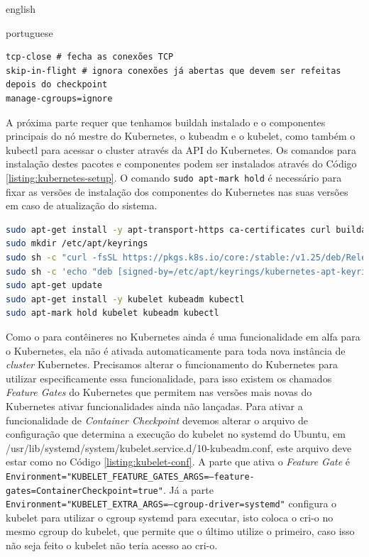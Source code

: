 \begin{otherlanguage*}{english}
\begin{otherlanguage*}{portuguese}
\begin{lstlisting}[language=plaintext,caption={Configuração a ser incluída no arquivo de configurações do runc para o CRIU.},label={listing:runc-conf}]
tcp-close # fecha as conexões TCP
skip-in-flight # ignora conexões já abertas que devem ser refeitas depois do checkpoint
manage-cgroups=ignore
\end{lstlisting}

A próxima parte requer que tenhamos buildah instalado e o componentes principais do nó
mestre do Kubernetes, o kubeadm e o kubelet, como também o kubectl para acessar o cluster
através da  API do Kubernetes. Os comandos para instalação destes pacotes e componentes podem
ser instalados através do Código \ref{listing:kubernetes-setup}. O comando \texttt{sudo apt-mark hold}
é necessário para fixar as versões de instalação dos componentes do Kubernetes nas suas
versões em caso de atualização do sistema.

\begin{lstlisting}[language=bash,caption={Instalação dos pacotes necessários para Kubernetes e buildah.},label={listing:kubernetes-setup}]
sudo apt-get install -y apt-transport-https ca-certificates curl buildah make
sudo mkdir /etc/apt/keyrings
sudo sh -c "curl -fsSL https://pkgs.k8s.io/core:/stable:/v1.25/deb/Release.key | gpg --dearmor -o /etc/apt/keyrings/kubernetes-apt-keyring.gpg"
sudo sh -c 'echo "deb [signed-by=/etc/apt/keyrings/kubernetes-apt-keyring.gpg] https://pkgs.k8s.io/core:/stable:/v1.25/deb/ /" | tee /etc/apt/sources.list.d/kubernetes.list'
sudo apt-get update
sudo apt-get install -y kubelet kubeadm kubectl
sudo apt-mark hold kubelet kubeadm kubectl
\end{lstlisting}

Como o  para contêineres no Kubernetes ainda é uma funcionalidade em alfa para
o Kubernetes, ela não é ativada automaticamente para toda nova instância de \textit{cluster}
Kubernetes. Precisamos alterar o funcionamento do Kubernetes para utilizar especificamente essa
funcionalidade, para isso existem os chamados \textit{Feature Gates} do Kubernetes que permitem
nas versões mais novas do Kubernetes ativar funcionalidades ainda não lançadas. Para ativar a
funcionalidade de \textit{Container Checkpoint} devemos alterar o arquivo de configuração que
determina a execução do kubelet no systemd do Ubuntu, em
/usr/lib/systemd/system/kubelet.service.d/10-kubeadm.conf, este arquivo deve estar como no
Código \ref{listing:kubelet-conf}. A parte que ativa o \textit{Feature Gate} é
\texttt{Environment="KUBELET\_FEATURE\_GATES\_ARGS=--feature-gates=ContainerCheckpoint=true"}. Já
a parte \texttt{Environment="KUBELET\_EXTRA\_ARGS=--cgroup-driver=systemd"} configura o kubelet
para utilizar o cgroup systemd para executar, isto coloca o cri-o no mesmo cgroup do kubelet, 
que permite que o último utilize o primeiro, caso isso não seja feito o kubelet não teria acesso
ao cri-o.


\end{otherlanguage*}
\end{otherlanguage*}
